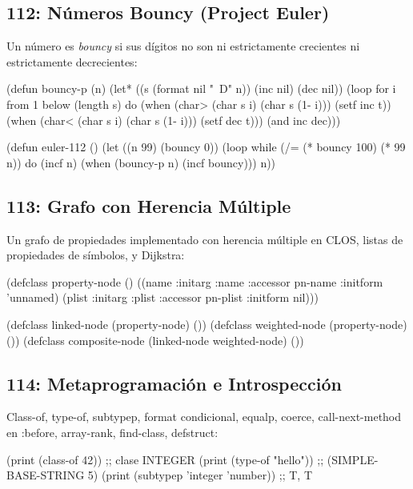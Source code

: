 \subsection*{112: Números Bouncy (Project Euler)}

Un número es \textit{bouncy} si sus dígitos no son ni estrictamente
crecientes ni estrictamente decrecientes:

\begin{lispcode}
(defun bouncy-p (n)
  (let* ((s (format nil "~D" n)) (inc nil) (dec nil))
    (loop for i from 1 below (length s)
          do (when (char> (char s i) (char s (1- i))) (setf inc t))
             (when (char< (char s i) (char s (1- i))) (setf dec t)))
    (and inc dec)))

(defun euler-112 ()
  (let ((n 99) (bouncy 0))
    (loop while (/= (* bouncy 100) (* 99 n))
          do (incf n) (when (bouncy-p n) (incf bouncy)))
    n))
\end{lispcode}

\subsection*{113: Grafo con Herencia Múltiple}

Un grafo de propiedades implementado con herencia múltiple en CLOS,
listas de propiedades de símbolos, y Dijkstra:

\begin{lispcode}
(defclass property-node ()
  ((name :initarg :name :accessor pn-name :initform 'unnamed)
   (plist :initarg :plist :accessor pn-plist :initform nil)))

(defclass linked-node (property-node) ())
(defclass weighted-node (property-node) ())
(defclass composite-node (linked-node weighted-node) ())
\end{lispcode}

\subsection*{114: Metaprogramación e Introspección}

Class-of, type-of, subtypep, format condicional, equalp, coerce,
call-next-method en :before, array-rank, find-class, defstruct:

\begin{lispcode}
(print (class-of 42))     ;; \to clase INTEGER
(print (type-of "hello")) ;; \to (SIMPLE-BASE-STRING 5)
(print (subtypep 'integer 'number)) ;; \to T, T
\end{lispcode}

